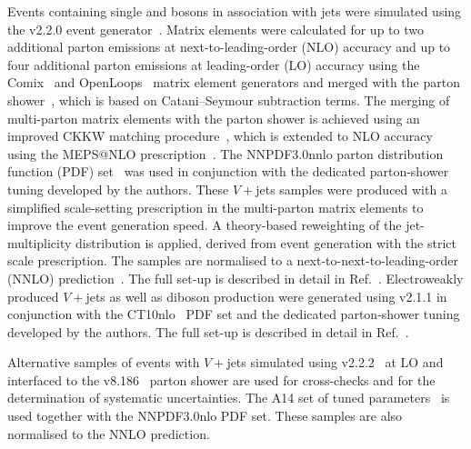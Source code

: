\documentclass[cernpreprint,txfonts,UKenglish,texlive=2016]{\ATLASLATEXPATH atlasdoc}
\begin{document}
Events containing single \Z{} and \W{} bosons in association with jets were simulated using the \sherpa{} v2.2.0
event generator~\cite{Gleisberg:2008ta}. Matrix elements were calculated for up to two additional parton emissions 
at next-to-leading-order (NLO) accuracy and up to four additional parton emissions at leading-order (LO) accuracy
using the Comix~\cite{Gleisberg:2008fv} and OpenLoops~\cite{Cascioli:2011va} matrix element generators and merged 
with the \sherpa{} parton shower~\cite{Schumann:2007mg}, which is based on Catani--Seymour subtraction terms.
The merging of multi-parton matrix elements with the parton shower is achieved using an improved 
CKKW matching procedure~\cite{Catani:2001cc,Hoeche:2009rj}, which is extended to NLO accuracy using the 
MEPS@NLO prescription~\cite{Hoeche:2012yf}.
The \textsc{NNPDF3.0}nnlo parton distribution function (PDF) set~\cite{Ball:2014uwa} was used in conjunction with 
the dedicated parton-shower tuning developed by the \sherpa{} authors.
These $V+$jets samples were produced with a simplified scale-setting prescription in the multi-parton matrix elements
to improve the event generation speed. A theory-based reweighting of the jet-multiplicity distribution is applied, 
derived from event generation with the strict scale prescription.
The samples are normalised to a next-to-next-to-leading-order (NNLO)
prediction~\cite{Anastasiou:2003ds}. The full set-up is described in
detail in Ref.~\cite{ATL-PHYS-PUB-2016-003}.
Electroweakly produced $V+$jets as well as diboson production were generated 
using \sherpa{} v2.1.1 in conjunction with 
the CT10nlo~\cite{Lai:2010vv} PDF set and the dedicated parton-shower tuning developed by the \sherpa{} authors. 
The full set-up is described in detail in Ref.~\cite{ATL-PHYS-PUB-2016-002}.




Alternative samples of events with $V+$jets simulated using \mgfive{} v2.2.2~\cite{Alwall:2011uj} 
at LO and interfaced to the \pythia{} v8.186~\cite{Sjostrand:2007gs} parton shower 
are used for cross-checks and for the determination of systematic uncertainties.
The A14 set of tuned parameters~\cite{ATL-PHYS-PUB-2014-021} is used together with 
the NNPDF3.0nlo PDF set. 
These samples are also normalised to the NNLO prediction.
\end{document}
